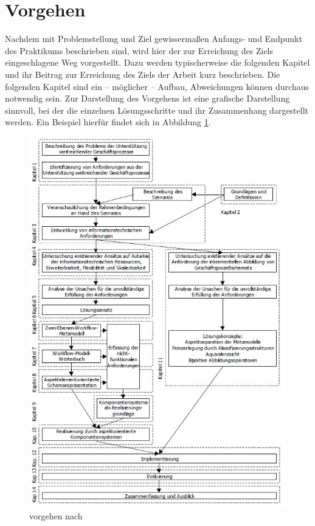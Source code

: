 \documentclass[oneside]{ausarbeitung}
\begin{document}
\section{Vorgehen}
\label{sec:vorgehen}

Nachdem mit Problemstellung und Ziel gewissermaßen Anfangs- und Endpunkt 
des Praktikums beschrieben sind, wird hier der zur Erreichung des Ziels 
eingeschlagene Weg vorgestellt. Dazu werden typischerweise die folgenden 
Kapitel und ihr Beitrag zur Erreichung des Ziels der Arbeit kurz 
beschrieben. Die folgenden Kapitel sind ein – möglicher – Aufbau, 
Abweichungen können durchaus notwendig sein. Zur Darstellung des 
Vorgehens ist eine grafische Darstellung sinnvoll, bei der die einzelnen 
Lösungsschritte und ihr Zusammenhang dargestellt werden. Ein Beispiel 
hierfür findet sich in Abbildung \ref{fig:1}.

\begin{figure}[htbp]
  \centering
  \includegraphics[height=0.9\textheight]{img/ausarbeitung.jpg}
  \caption{vorgehen nach \autocite{Schmidt:Geschaeftsprozesse}}
  \label{fig:1}
\end{figure}
\end{document}
